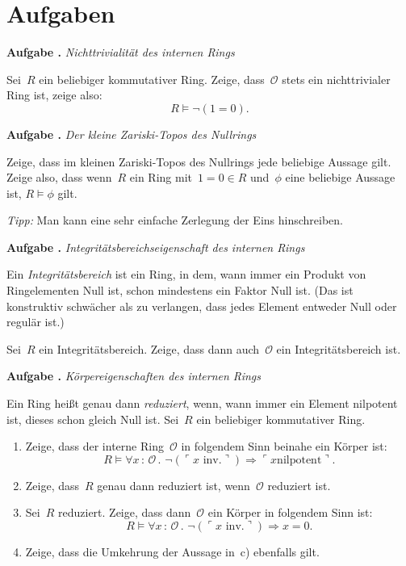 \documentclass[a4paper,ngerman,12pt]{scrartcl}
\theoremstyle{definition}
\theoremstyle{plain}
\theoremstyle{remark}
\renewcommand{\O}{\mathcal{O}}
\renewcommand{\_}{\mathpunct{.}\,}
\newcommand{\?}{\,{:}\,}
\newcommand{\speak}[1]{\ulcorner\text{#1}\urcorner}
\newlength{\aufgabenskip}
\newcounter{aufgabennummer}
\newenvironment{aufgabe}[1]{
  \addtocounter{aufgabennummer}{1}
  \textbf{Aufgabe \theaufgabennummer{}.} \emph{#1} \par
}{\vspace{\aufgabenskip}}
\begin{document}
\appendix
\section{Aufgaben}

\begin{aufgabe}{Nichttrivialität des internen Rings}
Sei~$R$ ein beliebiger kommutativer Ring. Zeige, dass~$\O$ stets ein
nichttrivialer Ring ist, zeige also:
\[ R \models \neg(1 = 0). \]
\end{aufgabe}
\vspace{-1.5em}

\begin{aufgabe}{Der kleine Zariski-Topos des Nullrings}
Zeige, dass im kleinen Zariski-Topos des Nullrings jede beliebige Aussage gilt.
Zeige also, dass wenn~$R$ ein Ring mit~$1 = 0 \in R$ und~$\phi$ eine beliebige
Aussage ist, $R \models \phi$ gilt.

\emph{Tipp:} Man kann eine sehr einfache Zerlegung der Eins hinschreiben.
\end{aufgabe}

\begin{aufgabe}{Integritätsbereichseigenschaft des internen Rings}
Ein \emph{Integritätsbereich} ist ein Ring, in dem, wann immer ein Produkt von
Ringelementen Null ist, schon mindestens ein Faktor Null ist. (Das ist
konstruktiv schwächer als zu verlangen, dass jedes Element entweder Null oder
regulär ist.)

Sei~$R$ ein Integritätsbereich. Zeige, dass dann auch~$\O$ ein
Integritätsbereich ist.
\end{aufgabe}

\begin{aufgabe}{Körpereigenschaften des internen Rings}
Ein Ring heißt genau dann \emph{reduziert}, wenn, wann immer ein Element
nilpotent ist, dieses schon gleich Null ist.
Sei~$R$ ein beliebiger kommutativer Ring.
\begin{enumerate}
\item Zeige, dass der interne Ring~$\O$ in folgendem Sinn beinahe ein Körper
ist:
\[ R \models \forall x\?\O\_ \neg(\speak{$x$ inv.}) \Rightarrow \speak{$x$
nilpotent}. \]
\vspace*{-1.8em}%
\item Zeige, dass~$R$ genau dann reduziert ist, wenn~$\O$ reduziert ist.
\item Sei~$R$ reduziert. Zeige, dass dann~$\O$ ein Körper in folgendem Sinn
ist:
\[ R \models \forall x\?\O\_ \neg(\speak{$x$ inv.}) \Rightarrow x = 0. \]
\vspace*{-1.8em}%
\item Zeige, dass die Umkehrung der Aussage in~c) ebenfalls gilt.
\end{enumerate}
\end{aufgabe}
\end{document}
